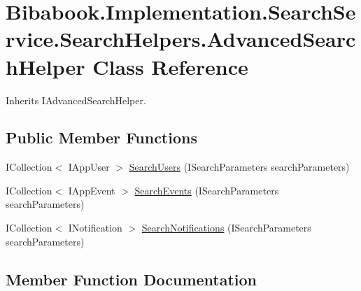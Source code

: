 \hypertarget{class_bibabook_1_1_implementation_1_1_search_service_1_1_search_helpers_1_1_advanced_search_helper}{}\section{Bibabook.\+Implementation.\+Search\+Service.\+Search\+Helpers.\+Advanced\+Search\+Helper Class Reference}
\label{class_bibabook_1_1_implementation_1_1_search_service_1_1_search_helpers_1_1_advanced_search_helper}


Inherits I\+Advanced\+Search\+Helper.

\subsection*{Public Member Functions}
\begin{DoxyCompactItemize}
\item 
I\+Collection$<$ I\+App\+User $>$ \hyperlink{class_bibabook_1_1_implementation_1_1_search_service_1_1_search_helpers_1_1_advanced_search_helper_ab02a91ef566b046b1c262878d1526f3f}{Search\+Users} (I\+Search\+Parameters search\+Parameters)
\item 
I\+Collection$<$ I\+App\+Event $>$ \hyperlink{class_bibabook_1_1_implementation_1_1_search_service_1_1_search_helpers_1_1_advanced_search_helper_a76dca0f2fa9ac28f27f810bc9b2a9a34}{Search\+Events} (I\+Search\+Parameters search\+Parameters)
\item 
I\+Collection$<$ I\+Notification $>$ \hyperlink{class_bibabook_1_1_implementation_1_1_search_service_1_1_search_helpers_1_1_advanced_search_helper_ae056d1d973a77ac9de5f89705b2996cd}{Search\+Notifications} (I\+Search\+Parameters search\+Parameters)
\end{DoxyCompactItemize}


\subsection{Member Function Documentation}
\hypertarget{class_bibabook_1_1_implementation_1_1_search_service_1_1_search_helpers_1_1_advanced_search_helper_a76dca0f2fa9ac28f27f810bc9b2a9a34}{}
